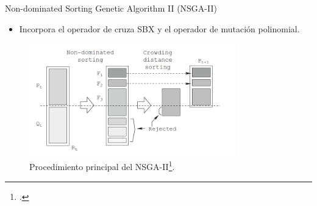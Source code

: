 \documentclass{beamer}
\begin{document}
\begin{frame}{Non-dominated Sorting Genetic Algorithm II (NSGA-II)}
\begin{itemize}
\scriptsize
\item Incorpora el operador de cruza SBX y el operador de mutación polinomial.
\end{itemize}

\begin{figure}[H]
\centering
\includegraphics[width=0.8\textwidth]{Images/nsgaii_main.png}
\caption{\scriptsize Procedimiento principal del NSGA-II\footcite{Joel:NSGAII}.}
\end{figure}
\end{frame}
\end{document}
